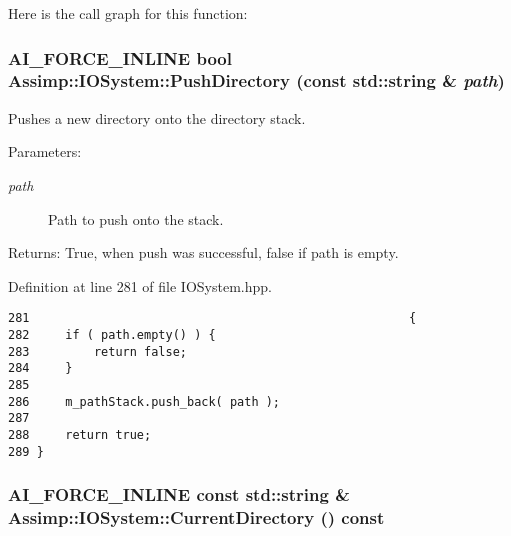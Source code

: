 Here is the call graph for this function:\hypertarget{class_assimp_1_1_i_o_system_07c2c93fac300df44c756174fcea71e8}{
\subsubsection[PushDirectory]{\setlength{\rightskip}{0pt plus 5cm}AI\_\-FORCE\_\-INLINE bool Assimp::IOSystem::PushDirectory (const std::string \& {\em path})}}
\label{class_assimp_1_1_i_o_system_07c2c93fac300df44c756174fcea71e8}


Pushes a new directory onto the directory stack. 

\begin{Desc}
\item[Parameters:]
\begin{description}
\item[{\em path}]Path to push onto the stack. \end{description}
\end{Desc}
\begin{Desc}
\item[Returns:]True, when push was successful, false if path is empty. \end{Desc}


Definition at line 281 of file IOSystem.hpp.

\begin{Code}\begin{verbatim}281                                                     {
282     if ( path.empty() ) {
283         return false;
284     }
285 
286     m_pathStack.push_back( path );
287 
288     return true;
289 }
\end{verbatim}
\end{Code}


\hypertarget{class_assimp_1_1_i_o_system_9b30a76a279c6559488bdef10d5c2315}{
\subsubsection[CurrentDirectory]{\setlength{\rightskip}{0pt plus 5cm}AI\_\-FORCE\_\-INLINE const std::string \& Assimp::IOSystem::CurrentDirectory () const}}
\label{class_assimp_1_1_i_o_system_9b30a76a279c6559488bdef10d5c2315}


